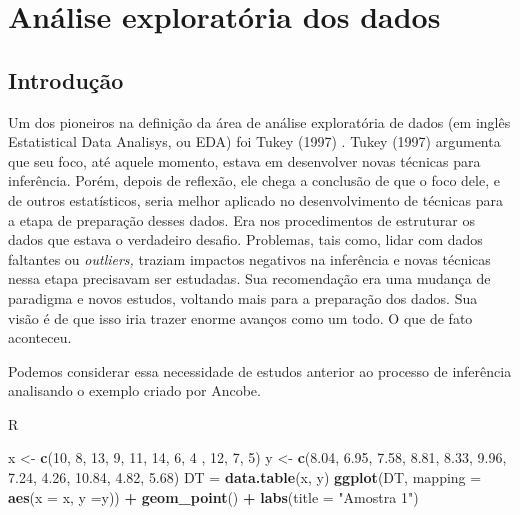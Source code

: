 \documentclass[
]{book}
\newenvironment{Shaded}{\begin{snugshade}}{\end{snugshade}}
\newcommand{\AttributeTok}[1]{\textcolor[rgb]{0.13,0.29,0.53}{#1}}
\newcommand{\DecValTok}[1]{\textcolor[rgb]{0.00,0.00,0.81}{#1}}
\newcommand{\FloatTok}[1]{\textcolor[rgb]{0.00,0.00,0.81}{#1}}
\newcommand{\FunctionTok}[1]{\textcolor[rgb]{0.13,0.29,0.53}{\textbf{#1}}}
\newcommand{\NormalTok}[1]{#1}
\newcommand{\OtherTok}[1]{\textcolor[rgb]{0.56,0.35,0.01}{#1}}
\newcommand{\SpecialCharTok}[1]{\textcolor[rgb]{0.81,0.36,0.00}{\textbf{#1}}}
\newcommand{\StringTok}[1]{\textcolor[rgb]{0.31,0.60,0.02}{#1}}
\begin{document}
\hypertarget{anuxe1lise-exploratuxf3ria-dos-dados}{%
\chapter{Análise exploratória dos dados}\label{anuxe1lise-exploratuxf3ria-dos-dados}}

\hypertarget{introduuxe7uxe3o-1}{%
\section{Introdução}\label{introduuxe7uxe3o-1}}

Um dos pioneiros na definição da área de análise exploratória de dados (em inglês Estatistical Data Analisys, ou EDA) foi Tukey (1997) \citep{tukey1977exploratory}. Tukey (1997) argumenta que seu foco, até aquele momento, estava em desenvolver novas técnicas para inferência. Porém, depois de reflexão, ele chega a conclusão de que o foco dele, e de outros estatísticos, seria melhor aplicado no desenvolvimento de técnicas para a etapa de preparação desses dados. Era nos procedimentos de estruturar os dados que estava o verdadeiro desafio. Problemas, tais como, lidar com dados faltantes ou \emph{outliers,} traziam impactos negativos na inferência e novas técnicas nessa etapa precisavam ser estudadas. Sua recomendação era uma mudança de paradigma e novos estudos, voltando mais para a preparação dos dados. Sua visão é de que isso iria trazer enorme avanços como um todo. O que de fato aconteceu.

Podemos considerar essa necessidade de estudos anterior ao processo de inferência analisando o exemplo criado por Ancobe.

R

\begin{Shaded}
\begin{Highlighting}[]
\NormalTok{x }\OtherTok{\textless{}{-}} \FunctionTok{c}\NormalTok{(}\DecValTok{10}\NormalTok{, }\DecValTok{8}\NormalTok{, }\DecValTok{13}\NormalTok{, }\DecValTok{9}\NormalTok{, }\DecValTok{11}\NormalTok{, }\DecValTok{14}\NormalTok{, }\DecValTok{6}\NormalTok{, }\DecValTok{4}\NormalTok{ , }\DecValTok{12}\NormalTok{, }\DecValTok{7}\NormalTok{, }\DecValTok{5}\NormalTok{)}
\NormalTok{y }\OtherTok{\textless{}{-}} \FunctionTok{c}\NormalTok{(}\FloatTok{8.04}\NormalTok{, }\FloatTok{6.95}\NormalTok{, }\FloatTok{7.58}\NormalTok{, }\FloatTok{8.81}\NormalTok{, }\FloatTok{8.33}\NormalTok{, }\FloatTok{9.96}\NormalTok{, }\FloatTok{7.24}\NormalTok{, }\FloatTok{4.26}\NormalTok{, }\FloatTok{10.84}\NormalTok{, }\FloatTok{4.82}\NormalTok{, }\FloatTok{5.68}\NormalTok{)}
\NormalTok{DT }\OtherTok{=} \FunctionTok{data.table}\NormalTok{(x, y)}
\FunctionTok{ggplot}\NormalTok{(DT, }\AttributeTok{mapping =} \FunctionTok{aes}\NormalTok{(}\AttributeTok{x =}\NormalTok{ x, }\AttributeTok{y =}\NormalTok{y)) }\SpecialCharTok{+}
  \FunctionTok{geom\_point}\NormalTok{() }\SpecialCharTok{+}
  \FunctionTok{labs}\NormalTok{(}\AttributeTok{title =} \StringTok{"Amostra 1"}\NormalTok{)}
\end{Highlighting}
\end{Shaded}
\end{document}
